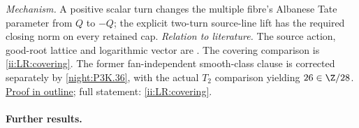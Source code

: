 \textit{Mechanism.} A positive scalar turn changes the multiple
fibre's Albanese Tate parameter from $Q$ to $-Q$; the explicit
two-turn source-line lift has the required closing norm on every
retained cap.
\textit{Relation to literature.} The source action, good-root
lattice and logarithmic vector are
\cite[Lemma~2.7, Corollary~2.8, pp.~6--7; Proposition~3.6 and
Definition~3.7, pp.~9--10 of the attached-source edition]{LiuRollenske2026}.
The covering comparison is \ref{ii:LR:covering}. The former
fan-independent smooth-class clause is corrected separately by
\ref{night:P3K.36}, with the actual $T_2$ comparison yielding
$26\in\Z/28$.
\hyperlink{outline-II-G}{Proof in outline}; full statement:
\ref{ii:LR:covering}.


\paragraph{Further results.}
\begingroup\small
